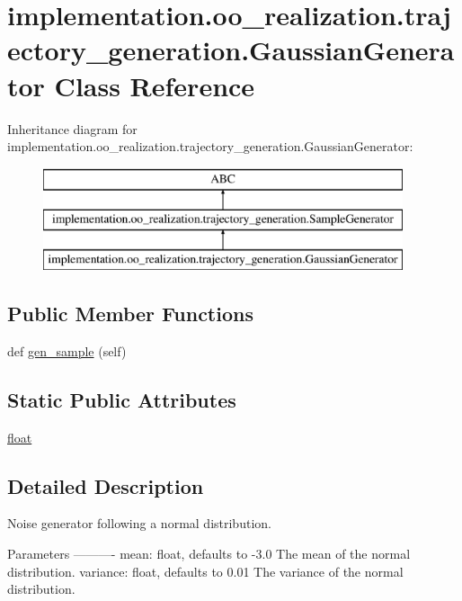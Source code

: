 \hypertarget{classimplementation_1_1oo__realization_1_1trajectory__generation_1_1_gaussian_generator}{}\section{implementation.\+oo\+\_\+realization.\+trajectory\+\_\+generation.\+Gaussian\+Generator Class Reference}
\label{classimplementation_1_1oo__realization_1_1trajectory__generation_1_1_gaussian_generator}
Inheritance diagram for implementation.\+oo\+\_\+realization.\+trajectory\+\_\+generation.\+Gaussian\+Generator\+:\begin{figure}[H]
\begin{center}
\leavevmode
\includegraphics[height=3.000000cm]{classimplementation_1_1oo__realization_1_1trajectory__generation_1_1_gaussian_generator}
\end{center}
\end{figure}
\subsection*{Public Member Functions}
\begin{DoxyCompactItemize}
\item 
def \hyperlink{classimplementation_1_1oo__realization_1_1trajectory__generation_1_1_gaussian_generator_a5b9c7e303b60933e708ebd97a57ff8ac}{gen\+\_\+sample} (self)
\end{DoxyCompactItemize}
\subsection*{Static Public Attributes}
\begin{DoxyCompactItemize}
\item 
\hyperlink{classimplementation_1_1oo__realization_1_1trajectory__generation_1_1_gaussian_generator_a85f16a0786b3da2294699edb9768c300}{float}
\end{DoxyCompactItemize}


\subsection{Detailed Description}
\begin{DoxyVerb}Noise generator following a normal distribution.

Parameters
----------
    mean: float, defaults to -3.0
        The mean of the normal distribution.
    variance: float, defaults to 0.01
        The variance of the normal distribution.
\end{DoxyVerb}
 

